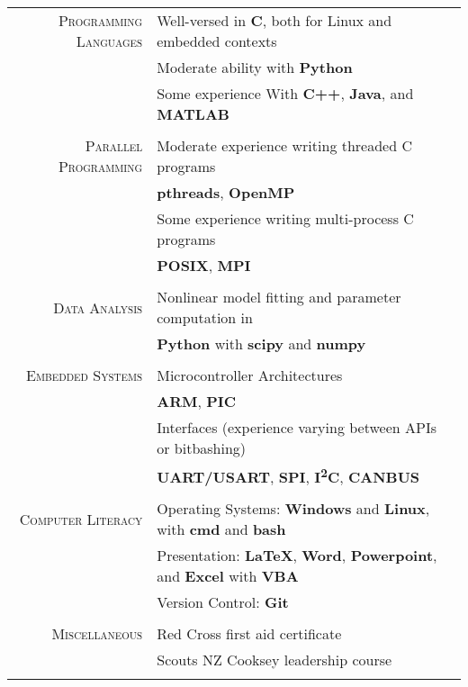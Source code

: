 \documentclass[a4paper,10pt]{article} %
\begin{document}
\begin{tabular}{r|l}
	
\textsc{Programming Languages} & Well-versed in \textbf{C}, both for Linux and embedded contexts \\ 
& Moderate ability with \textbf{Python} \\
& Some experience With \textbf{C++}, \textbf{Java}, and \textbf{MATLAB} \\
\multicolumn{2}{c}{} \\

\textsc{Parallel Programming} & Moderate experience writing threaded C programs \\
& \quad \small{\textbf{pthreads}, \textbf{OpenMP}} \\
& Some experience writing multi-process C programs \\
& \quad \small{\textbf{POSIX}, \textbf{MPI}} \\
\multicolumn{2}{c}{} \\

\textsc{Data Analysis} & Nonlinear model fitting and parameter computation in \\
& \textbf{Python} with \textbf{scipy} and \textbf{numpy} \\
\multicolumn{2}{c}{} \\

\textsc{Embedded Systems} & Microcontroller Architectures \\
& \quad \small{\textbf{ARM}, \textbf{PIC}} \\
& Interfaces (experience varying between APIs or bitbashing) \\
& \quad \small{\textbf{UART/USART}, \textbf{SPI}, \textbf{I\textsuperscript{2}C}, \textbf{CANBUS}} \\
\multicolumn{2}{c}{} \\

\textsc{Computer Literacy} & Operating Systems: \textbf{Windows} and \textbf{Linux}, with \textbf{cmd} and \textbf{bash} \\
& Presentation: \textbf{\LaTeX}, \textbf{Word}, \textbf{Powerpoint}, and \textbf{Excel} with \textbf{VBA} \\
& Version Control: \textbf{Git} \\
\multicolumn{2}{c}{} \\

\textsc{Miscellaneous} & Red Cross first aid certificate \\
& Scouts NZ Cooksey leadership course\\
\multicolumn{2}{c}{} \\

\end{tabular}
\end{document}
